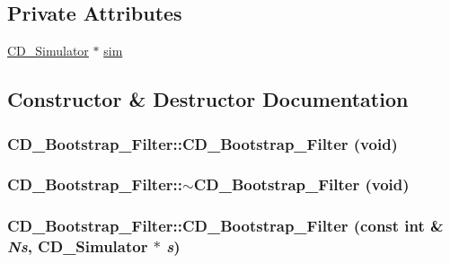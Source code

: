 \subsection*{Private Attributes}
\begin{CompactItemize}
\item 
\hyperlink{class_c_d___simulator}{CD\_\-Simulator} $\ast$ \hyperlink{class_c_d___bootstrap___filter_ac76dfed8e2d0d994558b50a4fe242f7}{sim}
\end{CompactItemize}


\subsection{Constructor \& Destructor Documentation}
\hypertarget{class_c_d___bootstrap___filter_5a6857c370a2573d8e3bcb4eab10eef2}{
\subsubsection[{CD\_\-Bootstrap\_\-Filter}]{\setlength{\rightskip}{0pt plus 5cm}CD\_\-Bootstrap\_\-Filter::CD\_\-Bootstrap\_\-Filter (void)}}
\label{class_c_d___bootstrap___filter_5a6857c370a2573d8e3bcb4eab10eef2}


\hypertarget{class_c_d___bootstrap___filter_13d757890e69283429b4a17893b639bc}{
\subsubsection[{$\sim$CD\_\-Bootstrap\_\-Filter}]{\setlength{\rightskip}{0pt plus 5cm}CD\_\-Bootstrap\_\-Filter::$\sim$CD\_\-Bootstrap\_\-Filter (void)}}
\label{class_c_d___bootstrap___filter_13d757890e69283429b4a17893b639bc}


\hypertarget{class_c_d___bootstrap___filter_b57c5fe3037188132aadb91d883da2dd}{
\subsubsection[{CD\_\-Bootstrap\_\-Filter}]{\setlength{\rightskip}{0pt plus 5cm}CD\_\-Bootstrap\_\-Filter::CD\_\-Bootstrap\_\-Filter (const int \& {\em Ns}, \/  {\bf CD\_\-Simulator} $\ast$ {\em s})}}
\label{class_c_d___bootstrap___filter_b57c5fe3037188132aadb91d883da2dd}


